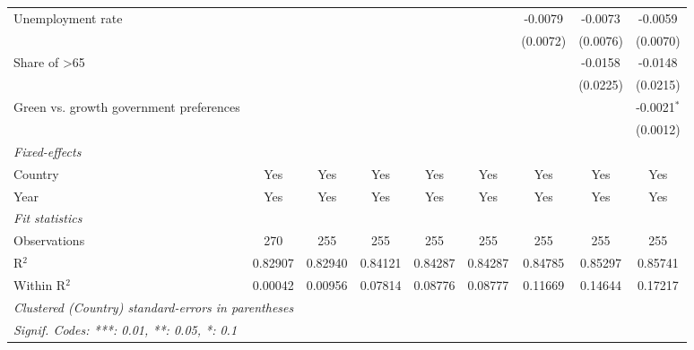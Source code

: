 \begin{table}[htbp]
\begin{tabular}{lcccccccc}
      Unemployment rate                                &          &          &              &               &               & -0.0079       & -0.0073        & -0.0059\\   
                                                       &          &          &              &               &               & (0.0072)      & (0.0076)       & (0.0070)\\   
      Share of >65                                     &          &          &              &               &               &               & -0.0158        & -0.0148\\   
                                                       &          &          &              &               &               &               & (0.0225)       & (0.0215)\\   
      Green vs. growth government preferences          &          &          &              &               &               &               &                & -0.0021$^{*}$\\   
                                                       &          &          &              &               &               &               &                & (0.0012)\\   
      \midrule
      \emph{Fixed-effects}\\
      Country                                          & Yes      & Yes      & Yes          & Yes           & Yes           & Yes           & Yes            & Yes\\  
      Year                                             & Yes      & Yes      & Yes          & Yes           & Yes           & Yes           & Yes            & Yes\\  
      \midrule
      \emph{Fit statistics}\\
      Observations                                     & 270      & 255      & 255          & 255           & 255           & 255           & 255            & 255\\  
      R$^2$                                            & 0.82907  & 0.82940  & 0.84121      & 0.84287       & 0.84287       & 0.84785       & 0.85297        & 0.85741\\  
      Within R$^2$                                     & 0.00042  & 0.00956  & 0.07814      & 0.08776       & 0.08777       & 0.11669       & 0.14644        & 0.17217\\  
      \midrule \midrule
      \multicolumn{9}{l}{\emph{Clustered (Country) standard-errors in parentheses}}\\
      \multicolumn{9}{l}{\emph{Signif. Codes: ***: 0.01, **: 0.05, *: 0.1}}\\
   \end{tabular}
\end{table}


